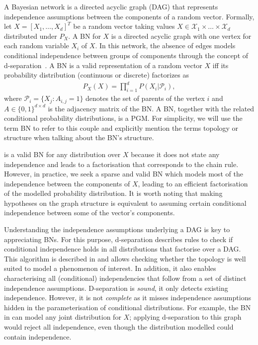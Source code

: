 A Bayesian network is a directed acyclic graph (DAG) that represents independence assumptions between the components of a random vector. Formally, let $X = \left[X_1, \hdots, X_d\right]^T$ be a random vector taking values $X \in \mathcal{X}_1 \times \dots \times \mathcal{X}_d$ distributed under $P_{X}$. A BN for $X$ is a directed acyclic graph with one vertex for each random variable $X_i$ of $X$. In this network, the absence of edges models conditional independence between groups of components through the concept of d-separation~\citep{d-separation}. A BN is a valid representation of a random vector $X$ iff its probability distribution (continuous or discrete) factorizes as
\begin{align}
    P_{X}(X) = \prod^d_{i=1}P(X_i|\mathcal{P}_i),\label{eq:BN-fact}
\end{align}
where  $\mathcal{P}_i = \{X_j: A_{i,j} = 1 \}$ denotes the set of parents of the vertex $i$ and $A \in \{0, 1\}^{d\times d}$ is the adjacency matrix of the BN. A BN, together with the related conditional probability distributions, is a PGM. For simplicity, we will use the term BN to refer to this couple and explicitly mention the terms topology or structure when talking about the BN's structure.

 is a valid BN for any distribution over $X$ because it does not state any independence and leads to a factorisation that corresponds to the chain rule. However, in practice, we seek a sparse and valid BN which models most of the independence between the components of $X$, leading to an efficient factorisation of the modelled probability distribution. It is worth noting that making hypotheses on the graph structure is equivalent to assuming certain conditional independence between some of the vector's components.

Understanding the independence assumptions underlying a DAG is key to appreciating BNs. For this purpose, d-separation describes rules to check if conditional independence holds in all distributions that factorise over a DAG. This algorithm is described in  and allows checking whether the topology is well suited to model a phenomenon of interest. In addition, it also enables characterising all (conditional) independencies that follow from a set of distinct independence assumptions. D-separation is \textit{sound}, it only detects existing independence. However, it is not \textit{complete} as it misses independence assumptions hidden in the parameterisation of conditional distributions. For example, the BN in  can model any joint distribution for $X$; applying d-separation to this graph would reject all independence, even though the distribution modelled could contain independence.
